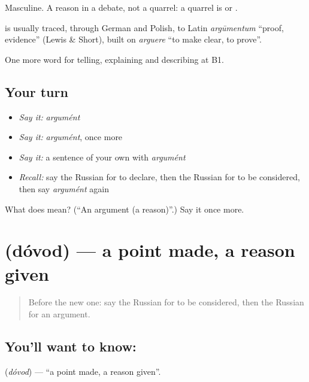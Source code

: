 Masculine. A reason in a debate, not a quarrel: a quarrel is \emph{} or \emph{}.

\begin{cousinweb}
\textbf{} is usually traced, through German and Polish, to Latin \emph{argūmentum} \textquotedblleft{}proof, evidence\textquotedblright{} (Lewis \& Short), built on \emph{arguere} \textquotedblleft{}to make clear, to prove\textquotedblright{}.
\end{cousinweb}

\begin{grammarlens}[title={What you've built}]
One more word for telling, explaining and describing at B1.
\end{grammarlens}

\subsection*{Your turn}
\begin{itemize}
\raggedright
  \item \emph{Say it:} \emph{argumént}
  \item \emph{Say it:} \emph{argumént}, once more
  \item \emph{Say it:} a sentence of your own with \emph{argumént}
  \item \emph{Recall:} say the Russian for to declare, then the Russian for to be considered, then say \emph{argumént} again
\end{itemize}

\begin{tcolorbox}[breakable,colback=teal!4,colframe=teal!35!black,title={Before you move on}]
What does  mean? (\textquotedblleft{}An argument (a reason)\textquotedblright{}.) Say it once more.
\end{tcolorbox}
\section[\texorpdfstring{\ru{довод} (dóvod)}{довод (dóvod)}]{ (dóvod) — a point made, a reason given}

\label{lesson:RU-C338-dovod}



\begin{quote}
Before the new one: say the Russian for to be considered, then the Russian for an argument.
\end{quote}

\subsection*{You'll want to know: }
\textbf{} (\emph{dóvod}) — \textquotedblleft{}a point made, a reason given\textquotedblright{}.

